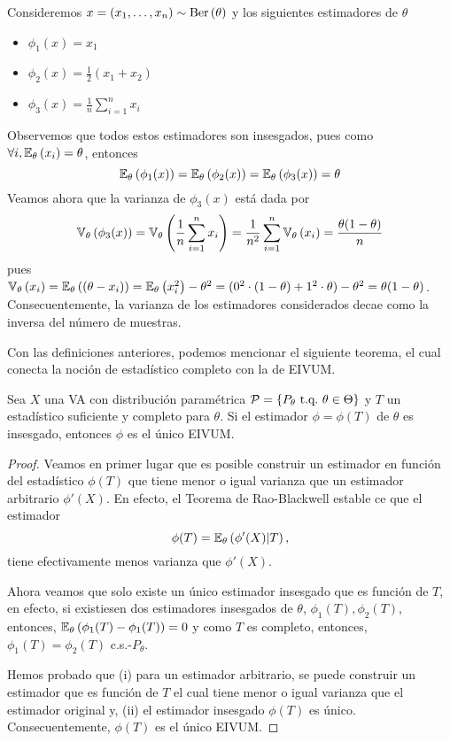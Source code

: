 \begin{example}
	Consideremos $x=(x_1,\ldots,x_n)\sim\text{Ber}\left(\theta\right)$ y los siguientes estimadores de $\theta$
	\begin{itemize}
		\item $\phi_1(x) = x_1$
		\item $\phi_2(x) = \frac{1}{2}(x_1+x_2)$
		\item $\phi_3(x) = \frac{1}{n}\sum_{i=1}^n x_i$
	\end{itemize}
	Observemos que todos estos estimadores son insesgados, pues como $\forall i, \mathbb{E}_\theta \left(x_i\right) = \theta$, entonces 
	\begin{equation}
		\mathbb{E}_\theta \left(\phi_1(x)\right) = \mathbb{E}_\theta \left(\phi_2(x)\right) = \mathbb{E}_\theta \left(\phi_3(x)\right) = \theta
	\end{equation}
	Veamos ahora que la varianza de $\phi_3(x)$ está dada por
	\begin{equation}
		\mathbb{V}_\theta \left(\phi_3(x)\right) = \mathbb{V}_\theta \left(\frac{1}{n}\sum_{i=1}^n x_i\right) = \frac{1}{n^2}\sum_{i=1}^n \mathbb{V}_\theta \left(x_i\right) = \frac{\theta(1-\theta)}{n}
	\end{equation}
	pues $\mathbb{V}_\theta \left(x_i\right) = \mathbb{E}_\theta \left((\theta - x_i)\right) = \mathbb{E}_\theta \left(x_i^2\right) - \theta^2 = (0^2 \cdot (1-\theta) + 1^2 \cdot \theta) - \theta^2 = \theta(1-\theta)$. Consecuentemente, la varianza de los estimadores considerados decae como la inversa del número de muestras.
\end{example}

Con las definiciones anteriores, podemos mencionar el siguiente teorema, el cual conecta la noción de estadístico completo con la de EIVUM. 

\begin{theorem}
	Sea $X$ una VA con distribución paramétrica $\mathcal{P} = \{P_\theta\ {\text{t.q.}}\ \theta\in\Theta\}$ y $T$ un estadístico suficiente y completo para $\theta$. Si el estimador $\phi = \phi(T)$ de $\theta$ es insesgado, entonces $\phi$ es el único EIVUM. 
 \end{theorem} 

 \begin{proof}
 	Veamos en primer lugar que es posible construir un estimador en función del estadístico $\phi(T)$ que tiene menor o igual varianza que un estimador arbitrario $\phi'(X)$. En efecto, el Teorema de Rao-Blackwell estable ce que el estimador 
 	\begin{equation}
 		\phi(T) = \mathbb{E}_\theta \left(\phi'(X)|T\right),
 	\end{equation}
 	tiene efectivamente menos varianza que $\phi'(X)$.

 	Ahora veamos que solo existe un único estimador insesgado que es función de $T$, en efecto, si existiesen dos estimadores insesgados de $\theta$, $\phi_1(T),\phi_2(T)$, entonces, $\mathbb{E}_\theta \left(\phi_1(T)-\phi_1(T)\right)=0$ y como $T$ es completo, entonces, $\phi_1(T) = \phi_2(T)$ c.s.-$P_\theta$.

 	Hemos probado que (i) para un estimador arbitrario, se puede construir un estimador que es función de $T$ el cual tiene menor o igual varianza que el estimador original y, (ii) el estimador insesgado $\phi(T)$ es único. Consecuentemente, $\phi(T)$ es el único EIVUM.
 \end{proof}

